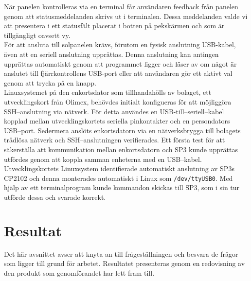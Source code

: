 \documentclass{article}
\begin{document}
            \noindent När panelen kontrolleras via en terminal får användaren feedback från panelen genom att statusmeddelanden skrivs ut i terminalen. 
            Dessa meddelanden valde vi att presentera i ett statusfält placerat i botten på pekskärmen och som är tillgängligt oavsett vy.\\

            \noindent För att ansluta till solpanelen krävs, förutom en fysisk anslutning USB-kabel, även att en seriell anslutning upprättas. Denna anslutning kan antingen upprättas automatiskt genom att programmet ligger och läser av om något är anslutet till fjärrkontrollens USB-port eller att användaren gör ett aktivt val genom att trycka på en knapp.\\


            
            Linuxsystemet på den enkortsdator som tillhandahölls av bolaget, ett utvecklingskort från Olimex, behövdes initialt konfigueras för att möjliggöra SSH--anslutning via nätverk. För detta användes en USB-till--seriell--kabel kopplad mellan utvecklings\-kortets seriella pinkontakter och en persondators USB--port. Seder\-mera anslöts enkortsdatorn via en nätverksbrygga till bolagets trådlösa nätverk och SSH--anslutningen verifierades. Ett första test för att säkerställa att kommunikation mellan enkortsdatorn och SP3 kunde upprättas utfördes genom att koppla samman enheterna med en USB--kabel. Utvecklings\-kortets Linuxsystem identifierade automatiskt anslutning av SP3s CP2102 och denna monterades automatiskt i \hbox{Linux} som \texttt{/dev/ttyUSB0}. Med hjälp av ett terminal\-program kunde kommandon skickas till SP3, som i sin tur utförde dessa och svarade korrekt.


    \newpage

    \section{Resultat} %
    \label{sec:resultat}
        Det här avsnittet avser att knyta an till frågeställningen och besvara de frågor som ligger till grund för arbetet. Resultatet presenteras genom en redovisning av den produkt som genomförandet har lett fram till. \\
\end{document}
